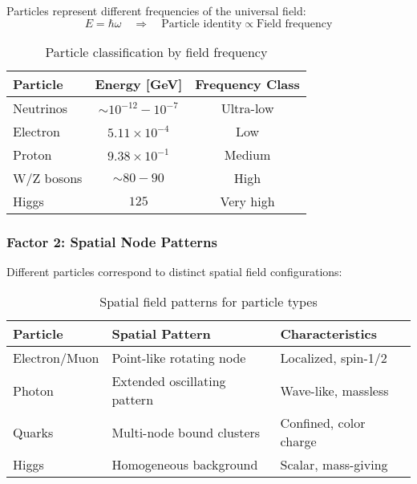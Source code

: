 \documentclass[12pt,a4paper]{article}
\newcommand{\myomega}{\ensuremath{\omega}}
\newcommand{\mytimes}{\ensuremath{\times}}
\newcommand{\myRightarrow}{\ensuremath{\Rightarrow}}
\newcommand{\mypropto}{\ensuremath{\propto}}
\newcommand{\mysim}{\ensuremath{\sim}}
\begin{document}
	Particles represent different frequencies of the universal field:
	\begin{equation}
		E = \hbar \myomega \quad \myRightarrow \quad \text{Particle identity} \mypropto \text{Field frequency}
		\label{eq:frequency_identity}
	\end{equation}
	
	\begin{table}[htbp]
		\centering
		\begin{tabular}{lcc}
			\toprule
			\textbf{Particle} & \textbf{Energy [GeV]} & \textbf{Frequency Class} \\
			\midrule
			Neutrinos & $\mysim 10^{-12} - 10^{-7}$ & Ultra-low \\
			Electron & $5.11 \mytimes 10^{-4}$ & Low \\
			Proton & $9.38 \mytimes 10^{-1}$ & Medium \\
			W/Z bosons & $\mysim 80-90$ & High \\
			Higgs & $125$ & Very high \\
			\bottomrule
		\end{tabular}
		\caption{Particle classification by field frequency}
		\label{tab:frequency_classification}
	\end{table}
	
	\subsubsection{Factor 2: Spatial Node Patterns}
	\label{subsubsec:spatial_patterns}
	
	Different particles correspond to distinct spatial field configurations:
	
	\begin{table}[htbp]
		\centering
		\begin{tabular}{lp{5cm}p{4cm}}
			\toprule
			\textbf{Particle} & \textbf{Spatial Pattern} & \textbf{Characteristics} \\
			\midrule
			Electron/Muon & Point-like rotating node & Localized, spin-1/2 \\
			Photon & Extended oscillating pattern & Wave-like, massless \\
			Quarks & Multi-node bound clusters & Confined, color charge \\
			Higgs & Homogeneous background & Scalar, mass-giving \\
			\bottomrule
		\end{tabular}
		\caption{Spatial field patterns for particle types}
		\label{tab:spatial_field_patterns}
	\end{table}
	
\end{document}
